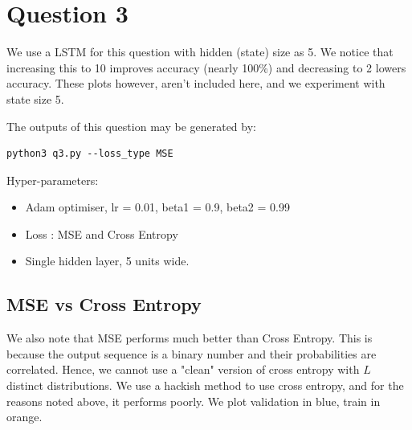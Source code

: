 \section{Question 3}

We use a LSTM for this question with hidden (state) size as 5. We notice that increasing this to 10 improves accuracy (nearly 100\%) and decreasing to 2 lowers accuracy. These plots however, aren't included here, and we experiment with state size 5.

The outputs of this question may be generated by:

\begin{lstlisting}
python3 q3.py --loss_type MSE
\end{lstlisting} 

Hyper-parameters:
\begin{itemize}
\item  Adam optimiser, lr = 0.01, beta1 = 0.9, beta2 = 0.99
\item  Loss : MSE and Cross Entropy
\item  Single hidden layer, 5 units wide.
\end{itemize}

\subsection{MSE vs Cross Entropy}

We also note that MSE performs much better than Cross Entropy. This is because the output sequence is a binary number and their probabilities are correlated. Hence, we cannot use a "clean" version of cross entropy with $L$ distinct distributions. We use a hackish method to use cross entropy, and for the reasons noted above, it performs poorly. We plot validation in blue, train in orange.

